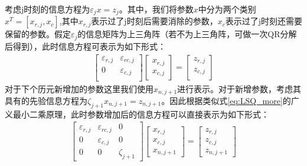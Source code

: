 考虑j时刻的信息方程为\(\varepsilon_{j}x=z_{j}\)。其中，我们将参数\(x\)中分为两个类别\(x^{T}=[x_{r,j},x_{c}]\),其中\(x_{r,j}\)表示过了j时刻后需要消除的参数，\(x_{c}\)表示过了j时刻还需要保留的参数。假定\(\varepsilon_{j}\)的信息矩阵为上三角阵（若不为上三角阵，可做一次QR分解后得到），此时信息方程可表示为如下形式：
\begin{equation}
	\begin{aligned}
		\begin{bmatrix}
			\varepsilon_{r,j} & \varepsilon_{rc,j} \\
			0 & \varepsilon_{c,j} \\
		\end{bmatrix}
		\begin{bmatrix}
			x_{r,j} \\
			x_{c,j}
		\end{bmatrix}
		 =
		\begin{bmatrix}
			z_{r,j} \\
			z_{c,j} \\	
		\end{bmatrix}
	\end{aligned}
\end{equation}
对于下个历元新增加的参数这里我们使用\(x_{n,j+1}\)进行表示。对于新增参数，考虑其具有的先验信息方程为\(\zeta_{j+1}x_{n,j+1}=z_{n,j+1}\)。因此根据类似式\eqref{eq:LSQ_more}的广义最小二乘原理，此时参数增加后的信息方程可以直接表示为如下形式：
\begin{equation}
	\begin{aligned}
		\begin{bmatrix}
		\varepsilon_{r,j} & \varepsilon_{rc,j} & 0 \\
		0 & \varepsilon_{c,j} & 0 \\
		0 & 0 & \zeta_{j+1} 
		\end{bmatrix}				
		\begin{bmatrix}
			x_{r,j}\\
			x_{c,j}\\
			x_{n,j+1}
		\end{bmatrix}	
		=
		\begin{bmatrix}
			z_{r,j}\\
			z_{c,j}\\
			z_{n,j+1}
		\end{bmatrix}
	\end{aligned}
	\label{eq:init_eq}
\end{equation}

